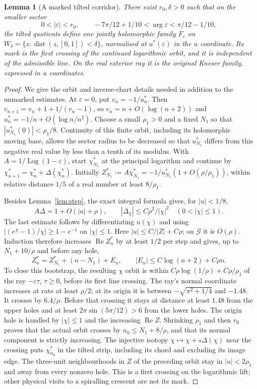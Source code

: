 \documentclass[11pt]{article}
\newtheorem{lemma}[theorem]{Lemma}
\newcommand{\re}{\operatorname{Re}}
\newcommand{\Log}{\operatorname{Log}}
\begin{document}
\begin{lemma}[A marked tilted corridor]\label{lem:marked-cusp}
There exist $r_0,\delta>0$ such that on the smaller sector
\[
 0<|\varepsilon|<r_0,\qquad
 -7\pi/12+1/10<\arg\varepsilon<\pi/12-1/10,
\]
the tilted quotients define one jointly holomorphic family $F_\varepsilon$
on $W_\delta=\{z:\operatorname{dist}(z,[0,1])<\delta\}$, normalised at
$u^*(\varepsilon)$ in the $u$ coordinate. Its mark is the first crossing
of the continued logarithmic orbit, and it is independent of the
admissible line. On the real exterior ray it is the original Kneser
family, expressed in $u$ coordinates.
\end{lemma}
\begin{proof}
We give the orbit and inverse-chart details needed in addition to the
unmarked estimates. At $\varepsilon=0$, put $v_n=-1/u_n^*$.
Then $v_{n+1}=v_n+1+1/(v_n-1)$, so
$v_n=n+O(\log(n+2))$ and
$u_n^*=-1/n+O(\log n/n^2)$. Choose a small $\rho_1>0$ and a fixed
$N_1$ so that $|u_{N_1}^*(0)|<\rho_1/8$. Continuity of this finite
orbit, including its holomorphic moving base, allows the sector radius
to be decreased so that $u_{N_1}^*$ differs from this negative real
value by less than a tenth of its modulus.
With $A=1/\Log(1-\varepsilon)$, start $\chi_{N_1}^*$ at the principal
logarithm and continue by $\chi_{n+1}^*=\chi_n^*+\Delta(\chi_n^*)$.
Initially $Z_{N_1}^*:=A\chi_{N_1}^*=-1/u_{N_1}^*(1+O(\rho/\rho_1))$,
within relative distance $1/5$ of a real number at least $8/\rho_1$.

Besides Lemma~\ref{lem:step}, the exact integral formula gives, for
$|u|<1/8$,
\[
 A\Delta=1+O(|u|+\rho),\qquad
 |\Delta_\chi|\le C\rho^2/|\chi|^2\quad(0<|\chi|\le1).
\]
The last estimate follows by differentiating $u(\chi)$ and using
$|(e^\chi-1)/\chi|\ge1-e^{-1}$ on $|\chi|\le1$.
Here $|u|\le C/|Z|+C\rho$; on $\mathcal G$ it is $O(\rho)$.
Induction therefore increases $\re Z_n^*$ by at least $1/2$ per step
and gives, up to $N_1+10/\rho$ and before any hole,
\[
 Z_n^*=Z_{N_1}^*+(n-N_1)+E_n,\qquad
 |E_n|\le C\log(n+2)+C\rho n.
\]
To close this bootstrap, the resulting $\chi$ orbit is within
$C\rho\log(1/\rho)+C\rho/\rho_1$ of the ray $-\varepsilon\tau$,
$\tau\ge0$, before its first line crossing. The ray's normal coordinate
increases at rate at least $\rho/2$; at its origin it is between
$-\sqrt{\pi^2+1/4}$ and $-1.48$. It crosses by $6.4/\rho$.
Before that crossing it stays at distance at least $1.48$ from the
upper holes and at least $2\pi\sin(5\pi/12)>6$ from the lower holes.
The origin hole is handled by $|\chi|\le1$ and the increasing $\re Z$.
Shrinking $\rho_1$ and then $r_0$ proves that the actual orbit crosses
by $n_0\le N_1+8/\rho$, and that its normal component is strictly
increasing. The injective isotopy $\chi\mapsto\chi+s\Delta(\chi)$
near the crossing puts $\chi_{n_0}^*$ in the tilted strip, including
its chord and excluding its image edge. The three-unit neighbourhoods
in $Z$ of the preceding orbit stay in $|u|<2\rho_1$ and away from
every nonzero hole. This is a first crossing on the logarithmic lift;
other physical visits to a spiralling crescent are not its mark.


\end{proof}
\end{document}
